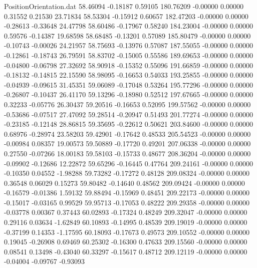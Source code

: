 \begin{filecontents}{PositionOrientation.dat}
  58.46094   -0.18187    0.59105   180.76209   -0.00000    0.00000    0.31552    0.21530   23.71834
  58.53304   -0.15912    0.60657   182.47203   -0.00000    0.00000   -0.28613   -0.33648   24.47798
  58.60486   -0.17967    0.58240   184.23004   -0.00000    0.00000    0.59576   -0.14387   19.68598
  58.68485   -0.13201    0.57089   185.80479   -0.00000    0.00000   -0.10743   -0.00026   24.21957
  58.75693   -0.13976    0.57087   187.55055   -0.00000    0.00000   -0.12861   -0.18743   26.79591
  58.83702   -0.15005    0.55586   189.69653   -0.00000    0.00000   -0.04800   -0.06798   27.32692
  58.90918   -0.15352    0.55096   191.66859   -0.00000    0.00000   -0.18132   -0.14815   22.15590
  58.98095   -0.16653    0.54033   193.25855   -0.00000    0.00000   -0.04939   -0.09615   31.45351
  59.06089   -0.17048    0.53264   195.77296   -0.00000    0.00000   -0.26807   -0.10437   26.41170
  59.13296   -0.18980    0.52512   197.67665   -0.00000    0.00000    0.32233   -0.05776   26.30437
  59.20516   -0.16653    0.52095   199.57562   -0.00000    0.00000   -0.53686   -0.07517   27.47092
  59.28514   -0.20947    0.51493   201.77274   -0.00000    0.00000   -0.23185   -0.12148   28.86815
  59.35695   -0.22612    0.50621   203.84600   -0.00000    0.00000    0.68976   -0.28974   23.58203
  59.42901   -0.17642    0.48533   205.54523   -0.00000    0.00000   -0.00984    0.08357   19.00573
  59.50889   -0.17720    0.49201   207.06338   -0.00000    0.00000    0.27550   -0.07266   18.00183
  59.58103   -0.15733    0.48677   208.36204   -0.00000    0.00000   -0.09902   -0.12686   12.22872
  59.65296   -0.16445    0.47764   209.24161   -0.00000    0.00000   -0.10350    0.04552   -1.98288
  59.73282   -0.17272    0.48128   209.08324   -0.00000    0.00000    0.36548    0.06029    0.15273
  59.80482   -0.14640    0.48562   209.09424   -0.00000    0.00000   -0.16579   -0.01386    1.59132
  59.88494   -0.15969    0.48451   209.22173   -0.00000    0.00000   -0.15017   -0.03165    0.99529
  59.95713   -0.17053    0.48222   209.29358   -0.00000    0.00000   -0.03778    0.00367    0.37443
  60.02893   -0.17324    0.48249   209.32047   -0.00000    0.00000    0.29116    0.03634   -1.62849
  60.10893   -0.14995    0.48539   209.19019   -0.00000    0.00000   -0.37199    0.14353   -1.17595
  60.18093   -0.17673    0.49573   209.10552   -0.00000    0.00000    0.19045   -0.26908    0.69469
  60.25302   -0.16300    0.47633   209.15560   -0.00000    0.00000    0.08541    0.13498   -0.43040
  60.33297   -0.15617    0.48712   209.12119   -0.00000    0.00000   -0.04004   -0.09767   -0.93093

\end{filecontents}

